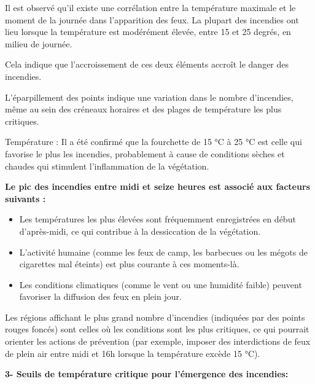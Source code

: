 \documentclass[
]{article}
\providecommand{\tightlist}{%
  \setlength{\itemsep}{0pt}\setlength{\parskip}{0pt}}
\begin{document}
Il est observé qu'il existe une corrélation entre la température
maximale et le moment de la journée dans l'apparition des feux. La
plupart des incendies ont lieu lorsque la température est modérément
élevée, entre 15 et 25 degrés, en milieu de journée.

Cela indique que l'accroissement de ces deux éléments accroît le danger
des incendies.

L'éparpillement des points indique une variation dans le nombre
d'incendies, même au sein des créneaux horaires et des plages de
température les plus critiques.

Température : Il a été confirmé que la fourchette de 15 °C à 25 °C est
celle qui favorise le plus les incendies, probablement à cause de
conditions sèches et chaudes qui stimulent l'inflammation de la
végétation.

\textbf{Le pic des incendies entre midi et seize heures est associé aux
facteurs suivants :}

\begin{itemize}
\tightlist
\item
  Les températures les plus élevées sont fréquemment enregistrées en
  début d'après-midi, ce qui contribue à la dessiccation de la
  végétation.
\item
  L'activité humaine (comme les feux de camp, les barbecues ou les
  mégots de cigarettes mal éteints) est plus courante à ces moments-là.
\item
  Les conditions climatiques (comme le vent ou une humidité faible)
  peuvent favoriser la diffusion des feux en plein jour.
\end{itemize}

Les régions affichant le plus grand nombre d'incendies (indiquées par
des points rouges foncés) sont celles où les conditions sont les plus
critiques, ce qui pourrait orienter les actions de prévention (par
exemple, imposer des interdictions de feux de plein air entre midi et
16h lorsque la température excède 15 °C).

\textbf{3- Seuils de température critique pour l'émergence des
incendies:}
\end{document}
